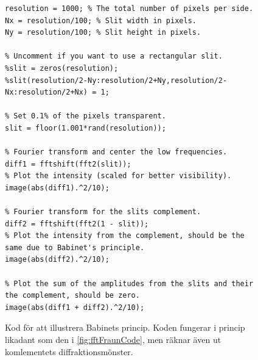\documentclass[a4paper]{article}
\begin{document}
\begin{figure}[ht]
	\centering
	\begin{lstlisting}
resolution = 1000; % The total number of pixels per side.
Nx = resolution/100; % Slit width in pixels.
Ny = resolution/100; % Slit height in pixels.

% Uncomment if you want to use a rectangular slit.
%slit = zeros(resolution);
%slit(resolution/2-Ny:resolution/2+Ny,resolution/2-Nx:resolution/2+Nx) = 1;

% Set 0.1% of the pixels transparent.
slit = floor(1.001*rand(resolution));

% Fourier transform and center the low frequencies.
diff1 = fftshift(fft2(slit));
% Plot the intensity (scaled for better visibility).
image(abs(diff1).^2/10);

% Fourier transform for the slits complement.
diff2 = fftshift(fft2(1 - slit));
% Plot the intensity from the complement, should be the same due to Babinet's principle.
image(abs(diff2).^2/10);

% Plot the sum of the amplitudes from the slits and their the complement, should be zero.
image(abs(diff1 + diff2).^2/10);
	\end{lstlisting}
	\caption{Kod för att illustrera Babinets princip. Koden fungerar i princip likadant som den i \autoref{fig:fftFraunCode}, men räknar även ut komlementets diffraktionsmönster.}
	\label{fig:babinetCode}
\end{figure}

\FloatBarrier
\end{document}
